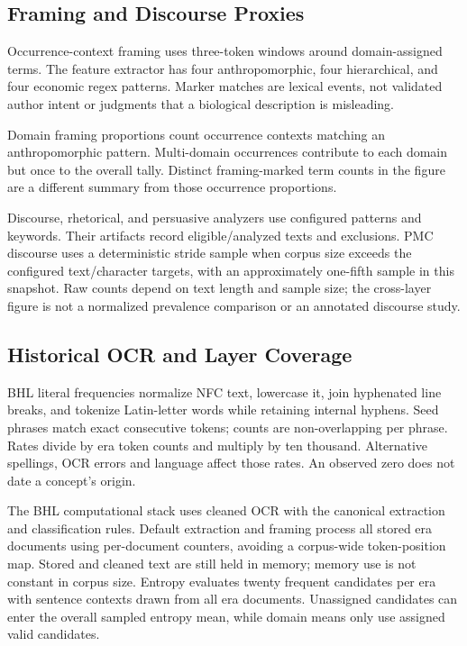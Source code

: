 \documentclass[
]{article}
\numberwithin{equation}{section}
\begin{document}
\subsection{Framing and Discourse
Proxies}\label{framing-and-discourse-proxies}

Occurrence-context framing uses three-token windows around
domain-assigned terms. The feature extractor has four anthropomorphic,
four hierarchical, and four economic regex patterns. Marker matches are
lexical events, not validated author intent or judgments that a
biological description is misleading.

Domain framing proportions count occurrence contexts matching an
anthropomorphic pattern. Multi-domain occurrences contribute to each
domain but once to the overall tally. Distinct framing-marked term
counts in the figure are a different summary from those occurrence
proportions.

Discourse, rhetorical, and persuasive analyzers use configured patterns
and keywords. Their artifacts record eligible/analyzed texts and
exclusions. PMC discourse uses a deterministic stride sample when corpus
size exceeds the configured text/character targets, with an
approximately one-fifth sample in this snapshot. Raw counts depend on
text length and sample size; the cross-layer figure is not a normalized
prevalence comparison or an annotated discourse study.

\subsection{Historical OCR and Layer
Coverage}\label{historical-ocr-and-layer-coverage}

BHL literal frequencies normalize NFC text, lowercase it, join
hyphenated line breaks, and tokenize Latin-letter words while retaining
internal hyphens. Seed phrases match exact consecutive tokens; counts
are non-overlapping per phrase. Rates divide by era token counts and
multiply by ten thousand. Alternative spellings, OCR errors and language
affect those rates. An observed zero does not date a concept's origin.

The BHL computational stack uses cleaned OCR with the canonical
extraction and classification rules. Default extraction and framing
process all stored era documents using per-document counters, avoiding a
corpus-wide token-position map. Stored and cleaned text are still held
in memory; memory use is not constant in corpus size. Entropy evaluates
twenty frequent candidates per era with sentence contexts drawn from all
era documents. Unassigned candidates can enter the overall sampled
entropy mean, while domain means only use assigned valid candidates.
\end{document}
